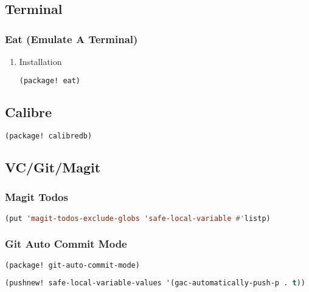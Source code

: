 \documentclass[11pt]{article}
\begin{document}
\subsection{Terminal}
\label{sec:terminal}


\subsubsection{Eat (Emulate A Terminal)}
\label{sec:eat-emulate-a-terminal}


\begin{enumerate}
  \item Installation
  \label{sec:installation-3}

  \begin{lstlisting}[language=Lisp]
(package! eat)
\end{lstlisting}
\end{enumerate}


\subsection{Calibre}
\label{sec:calibre}
\begin{lstlisting}[language=Lisp]
(package! calibredb)
\end{lstlisting}

\subsection{VC/Git/Magit}
\label{sec:vcgitmagit}


\subsubsection{Magit Todos}
\label{sec:magit-todos}
\begin{lstlisting}[language=Lisp]
(put 'magit-todos-exclude-globs 'safe-local-variable #'listp)
\end{lstlisting}

\subsubsection{Git Auto Commit Mode}
\label{sec:git-auto-commit-mode}
\begin{lstlisting}[language=Lisp]
(package! git-auto-commit-mode)
\end{lstlisting}

\begin{lstlisting}[language=Lisp]
(pushnew! safe-local-variable-values '(gac-automatically-push-p . t))
\end{lstlisting}
\end{document}
